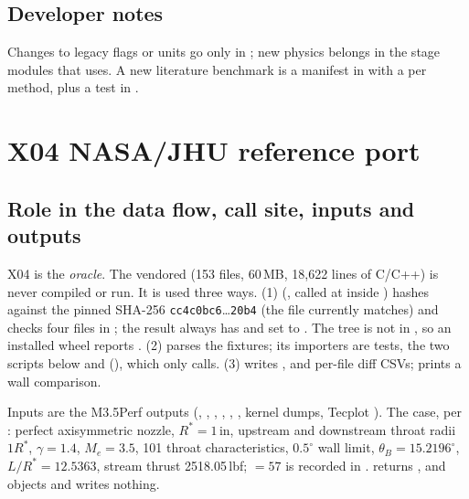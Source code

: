 \subsection{Developer notes}

Changes to legacy flags or units go only in ; new physics belongs in the stage modules that  uses. A new literature benchmark is a manifest in  with a  per method, plus a test in .

\section{X04 NASA/JHU reference port}\label{sec:x04-nasa}

\subsection{Role in the data flow, call site, inputs and outputs}

X04 is the \emph{oracle}. The vendored  (153 files, 60\,MB, 18{,}622 lines of C/C++) is never compiled or run. It is used three ways. (1)  (, called at  inside ) hashes  against the pinned SHA-256 \texttt{cc4c0bc6}\ldots\texttt{20b4} (the file currently matches) and checks four files in ; the result always has  and  set to . The tree is not in , so an installed wheel reports . (2)  parses the fixtures; its importers are tests, the two scripts below and  (), which only  calls. (3)  writes ,  and per-file diff CSVs;  prints a wall comparison.

Inputs are the M3.5Perf outputs (, , , , , , kernel dumps, Tecplot ). The case, per : perfect axisymmetric nozzle, $R^*=1$\,in, upstream and downstream throat radii $1R^*$, $\gamma=1.4$, $M_e=3.5$, 101 throat characteristics, $0.5^\circ$ wall limit, $\theta_B=15.2196^\circ$, $L/R^*=12.5363$, stream thrust 2518.05\,lbf;  $=57$ is recorded in .  returns ,  and  objects and writes nothing.

